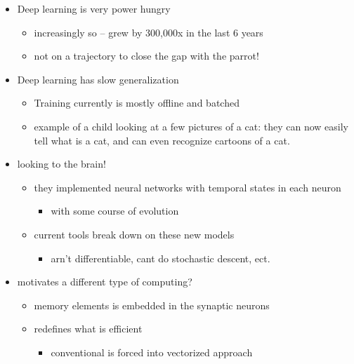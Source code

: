 \documentclass[letterpaper]{article}
\begin{document}
\begin{itemize}
\item Deep learning is very power hungry

\begin{itemize}
\item increasingly so -- grew by 300,000x in the last 6 years
\item not on a trajectory to close the gap with the parrot!
\end{itemize}

\item Deep learning has slow generalization

\begin{itemize}
\item Training currently is mostly offline and batched
\item example of a child looking at a few pictures of a cat: they can now
easily tell what is a cat, and can even recognize cartoons of a cat.
\end{itemize}

\item looking to the brain!

\begin{itemize}
\item they implemented neural networks with temporal states in each neuron

\begin{itemize}
\item with some course of evolution
\end{itemize}

\item current tools break down on these new models

\begin{itemize}
\item arn't differentiable, cant do stochastic descent, ect.
\end{itemize}
\end{itemize}

\item motivates a different type of computing?

\begin{itemize}
\item memory elements is embedded in the synaptic neurons
\item redefines what is efficient

\begin{itemize}
\item conventional is forced into vectorized approach
\end{itemize}
\end{itemize}


\end{itemize}
\end{document}
